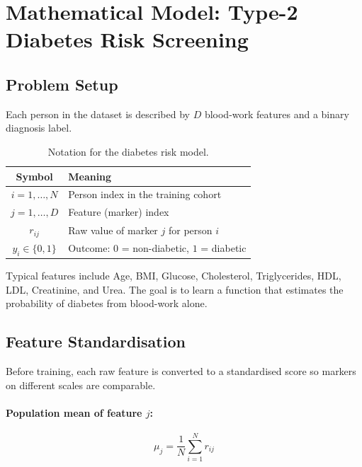 
\section{Mathematical Model: Type-2 Diabetes Risk Screening}

\subsection{Problem Setup}

Each person in the dataset is described by $D$ blood-work features and a binary diagnosis label.

\begin{table}[h]
\centering
\begin{tabular}{cl}
\hline
\textbf{Symbol} & \textbf{Meaning} \\
\hline
$i = 1,\ldots,N$ & Person index in the training cohort \\
$j = 1,\ldots,D$ & Feature (marker) index \\
$r_{ij}$ & Raw value of marker $j$ for person $i$ \\
$y_i \in \{0,1\}$ & Outcome: $0$ = non-diabetic, $1$ = diabetic \\
\hline
\end{tabular}
\caption{Notation for the diabetes risk model.}
\end{table}

Typical features include Age, BMI, Glucose, Cholesterol, Triglycerides, HDL, LDL, Creatinine, and Urea. The goal is to learn a function that estimates the probability of diabetes from blood-work alone.

\subsection{Feature Standardisation}

Before training, each raw feature is converted to a standardised score so markers on different scales are comparable.

\paragraph{Population mean of feature $j$:}
\begin{equation}
    \mu_j = \frac{1}{N}\sum_{i=1}^{N} r_{ij}
\end{equation}

